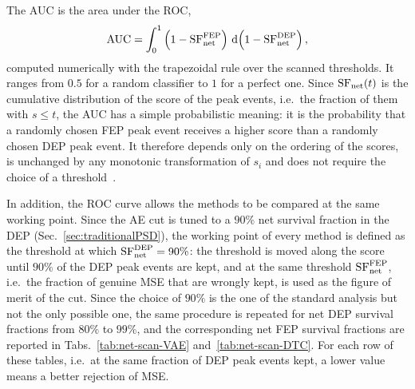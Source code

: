 The \ac{AUC} is the area under the \ac{ROC},
\begin{equation}
    \mathrm{AUC} = \int_0^1 \left(1 - \mathrm{SF}^{\rm FEP}_{\rm net}\right)\, \mathrm{d}\!\left(1 - \mathrm{SF}^{\rm DEP}_{\rm net}\right),
    \label{eq:auc}
\end{equation}
computed numerically with the trapezoidal rule over the scanned thresholds. It ranges from $0.5$ for a random classifier to $1$ for a perfect one. Since $\mathrm{SF}_{\rm net}(t)$ is the cumulative distribution of the score of the peak events, i.e.\ the fraction of them with $s \leq t$, the \ac{AUC} has a simple probabilistic meaning: it is the probability that a randomly chosen \ac{FEP} peak event receives a higher score than a randomly chosen \ac{DEP} peak event. It therefore depends only on the ordering of the scores, is unchanged by any monotonic transformation of $s_i$ and does not require the choice of a threshold~\cite{ROCanalysis, AUCHanley}.

In addition, the \ac{ROC} curve allows the methods to be compared at the same working point. Since the \ac{AE} cut is tuned to a $90\%$ net survival fraction in the \ac{DEP} (Sec.~\ref{sec:traditionalPSD}), the working point of every method is defined as the threshold at which $\mathrm{SF}^{\rm DEP}_{\rm net} = 90\%$: the threshold is moved along the score until $90\%$ of the \ac{DEP} peak events are kept, and at the same threshold $\mathrm{SF}^{\rm FEP}_{\rm net}$, i.e.\ the fraction of genuine \ac{MSE} that are wrongly kept, is used as the figure of merit of the cut. Since the choice of $90\%$ is the one of the standard analysis but not the only possible one, the same procedure is repeated for net \ac{DEP} survival fractions from $80\%$ to $99\%$, and the corresponding net \ac{FEP} survival fractions are reported in Tabs.~\ref{tab:net-scan-VAE} and~\ref{tab:net-scan-DTC}. For each row of these tables, i.e.\ at the same fraction of \ac{DEP} peak events kept, a lower value means a better rejection of \ac{MSE}.

